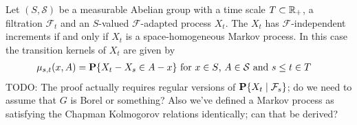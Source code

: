 \begin{lem}\label{IndependentIncrements}Let $(S, \mathcal{S})$ be a measurable Abelian group with a
  time scale $T \subset \reals_+$, a filtration $\mathcal{F}_t$ and an
 $S$-valued $\mathcal{F}$-adapted process $X_t$.  The $X_t$ has
$\mathcal{F}$-independent increments if and only if $X_t$ is a space-homogeneous
 Markov process.  In this case the transition kernels of $X_t$ are
 given by
\begin{align*}
\mu_{s, t}(x, A) &= \probability{X_t - X_s \in A - x} \text{ for $x
  \in S$, $A \in \mathcal{S}$ and $s \leq t \in T$}
\end{align*}
TODO: The proof actually requires regular versions of
$\cprobability{\mathcal{F}_s}{X_t}$; do we need to assume that
$G$ is Borel or something?  Also we've defined a Markov process as
satisfying the Chapman Kolmogorov relations identically; can that be derived?
\end{lem}
